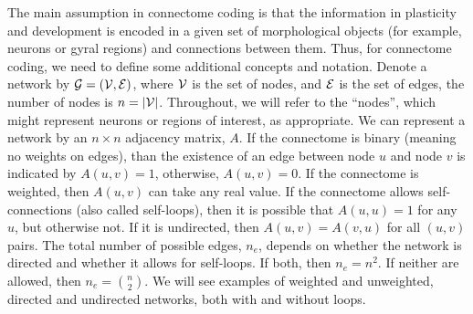 \documentclass[11pt]{article}
\begin{document}
The main assumption in connectome coding is that the information in  plasticity and development is encoded in a given set of morphological objects (for example, neurons  or gyral regions) and connections between them.
Thus, for connectome coding, we need to define some additional concepts and notation. 
Denote a network  by $\mathcal{G}= (\mathcal{V},\mathcal{E})$, where $\mathcal{V}$ is the set of nodes, and $\mathcal{E}$ is the set of edges,  the number of nodes is $n=|\mathcal{V}|$.
Throughout, we will refer to the ``nodes'', which might represent neurons or regions of interest, as appropriate.
We can represent a network by an $n \times n$ adjacency matrix, $A$.   If the connectome is binary (meaning no weights on edges), than the existence of an edge between node $u$ and node $v$ is indicated by $A(u,v)=1$, otherwise, $A(u,v)=0$.  If the connectome is weighted, then $A(u,v)$ can take any real value. 
If the connectome allows self-connections (also called self-loops), then it is possible that $A(u,u)=1$ for any $u$, but otherwise not.  
 If it is undirected, then $A(u,v)=A(v,u)$ for all $(u,v)$ pairs.  
 The total number of possible edges, $n_e$, depends on whether the network is directed and whether it allows for self-loops.  If both, then $n_e=n^2$.  If neither are allowed, then $n_e = \binom{n}{2}$. 
 We will see examples of weighted and unweighted, directed and undirected networks, both with and without loops.
 
\end{document}
